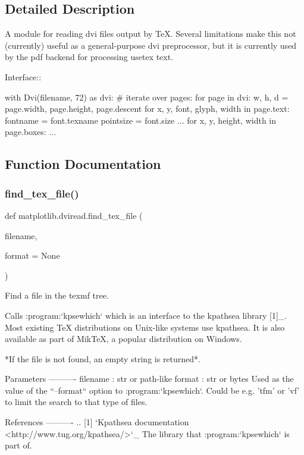 \subsection{Detailed Description}
\begin{DoxyVerb}A module for reading dvi files output by TeX. Several limitations make
this not (currently) useful as a general-purpose dvi preprocessor, but
it is currently used by the pdf backend for processing usetex text.

Interface::

  with Dvi(filename, 72) as dvi:
      # iterate over pages:
      for page in dvi:
  w, h, d = page.width, page.height, page.descent
  for x, y, font, glyph, width in page.text:
      fontname = font.texname
      pointsize = font.size
      ...
  for x, y, height, width in page.boxes:
      ...
\end{DoxyVerb}
 

\subsection{Function Documentation}
\mbox{\label{namespacematplotlib_1_1dviread_aded8f21bc8468b8fd589146ccf72ffce}} 
\subsubsection{\texorpdfstring{find\+\_\+tex\+\_\+file()}{find\_tex\_file()}}
{\footnotesize\ttfamily def matplotlib.\+dviread.\+find\+\_\+tex\+\_\+file (\begin{DoxyParamCaption}\item[{}]{filename,  }\item[{}]{format = {\ttfamily None} }\end{DoxyParamCaption})}

\begin{DoxyVerb}Find a file in the texmf tree.

Calls :program:`kpsewhich` which is an interface to the kpathsea
library [1]_. Most existing TeX distributions on Unix-like systems use
kpathsea. It is also available as part of MikTeX, a popular
distribution on Windows.

*If the file is not found, an empty string is returned*.

Parameters
----------
filename : str or path-like
format : str or bytes
    Used as the value of the ``--format`` option to :program:`kpsewhich`.
    Could be e.g. 'tfm' or 'vf' to limit the search to that type of files.

References
----------
.. [1] `Kpathsea documentation <http://www.tug.org/kpathsea/>`_
    The library that :program:`kpsewhich` is part of.
\end{DoxyVerb}
 

